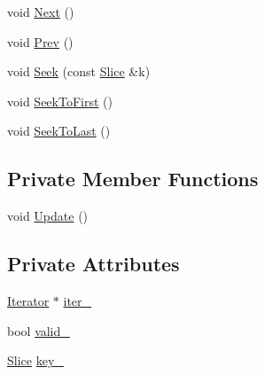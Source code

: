 \begin{DoxyCompactItemize}
\item 
void \hyperlink{classleveldb_1_1_iterator_wrapper_abcd48a4cbd0466c8566f2c12ad8a1038}{Next} ()
\item 
void \hyperlink{classleveldb_1_1_iterator_wrapper_abfd17dc9aef7f4d59603b2edab2ffb77}{Prev} ()
\item 
void \hyperlink{classleveldb_1_1_iterator_wrapper_a5dc3cd4e168e8ec0ab3a094cf36ae5d0}{Seek} (const \hyperlink{classleveldb_1_1_slice}{Slice} \&k)
\item 
void \hyperlink{classleveldb_1_1_iterator_wrapper_a06923cd8c121cf7491cc2b043a479445}{Seek\-To\-First} ()
\item 
void \hyperlink{classleveldb_1_1_iterator_wrapper_ae09179113b28aa3ea1da70b3a7a5f04b}{Seek\-To\-Last} ()
\end{DoxyCompactItemize}
\subsection*{Private Member Functions}
\begin{DoxyCompactItemize}
\item 
void \hyperlink{classleveldb_1_1_iterator_wrapper_ac89a9cfb38bbcaea2dc1c71e754ce73f}{Update} ()
\end{DoxyCompactItemize}
\subsection*{Private Attributes}
\begin{DoxyCompactItemize}
\item 
\hyperlink{classleveldb_1_1_iterator}{Iterator} $\ast$ \hyperlink{classleveldb_1_1_iterator_wrapper_a167c198349e18c74de31f3b5041ab5eb}{iter\-\_\-}
\item 
bool \hyperlink{classleveldb_1_1_iterator_wrapper_ab55d69f29a486d72c29319245cece3e9}{valid\-\_\-}
\item 
\hyperlink{classleveldb_1_1_slice}{Slice} \hyperlink{classleveldb_1_1_iterator_wrapper_a2f21505d8ed93356a2290526d8894850}{key\-\_\-}
\end{DoxyCompactItemize}


